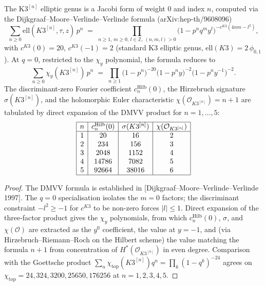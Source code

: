 \begin{proposition}
\label{prop:k3n-elliptic-genus-DMVV}
The K$3^{[n]}$ elliptic genus is a Jacobi form of weight $0$ and
index $n$, computed via the
Dijkgraaf--Moore--Verlinde--Verlinde formula
\textup{(}arXiv:hep-th/9608096\textup{)}
\[
 \sum_{n \geq 0} \mathrm{ell}(K3^{[n]}, \tau, z) \, p^n
 \;=\; \prod_{n \geq 1, \, m \geq 0, \, l \in \mathbb{Z},
 \, (n, m, l) > 0}
 \bigl(1 - p^n q^m y^l\bigr)^{-c^{K3}(4 n m - l^2)},
\]
with $c^{K3}(0) = 20$, $c^{K3}(-1) = 2$
\textup{(}standard K$3$ elliptic genus,
$\mathrm{ell}(K3) = 2 \, \phi_{0, 1}$\textup{).}
At $q = 0$, restricted to the $\chi_y$ polynomial, the formula reduces to
\[
 \sum_{n \geq 0} \chi_y(K3^{[n]}) \, p^n
 \;=\; \prod_{n \geq 1}
 \bigl(1 - p^n\bigr)^{-20}
 \bigl(1 - p^n y\bigr)^{-2}
 \bigl(1 - p^n y^{-1}\bigr)^{-2}.
\]
The discriminant-zero Fourier coefficient $c_n^{\mathrm{Hilb}}(0)$, the
Hirzebruch signature $\sigma(K3^{[n]})$, and the holomorphic Euler
characteristic \(\chi(\mathcal{O}_{K3^{[n]}})=n+1\) are tabulated by
direct expansion of the DMVV product for \(n=1,\ldots,5\):
\[
\begin{array}{|c|c|c|c|}
\hline
n & c_n^{\mathrm{Hilb}}(0) & \sigma(K3^{[n]}) & \chi(\mathcal{O}_{K3^{[n]}}) \\
\hline
1 & 20 & 16 & 2 \\
2 & 234 & 156 & 3 \\
3 & 2048 & 1152 & 4 \\
4 & 14786 & 7082 & 5 \\
5 & 92664 & 38016 & 6 \\
\hline
\end{array}
\]
\end{proposition}

\begin{proof}[Proof]
The DMVV formula is established in
\textup{[}Dijkgraaf--Moore--Verlinde--Verlinde 1997\textup{].} The
$q = 0$ specialisation isolates the $m = 0$ factors;
the discriminant constraint $-l^2 \geq -1$ for $c^{K3}$ to be
non-zero forces $|l| \leq 1$. Direct expansion of the three-factor
product gives the $\chi_y$ polynomials, from which $c_n^{\mathrm{Hilb}}(0)$,
$\sigma$, and $\chi(\mathcal{O})$ are extracted as the $y^0$ coefficient,
the value at $y = -1$, and \textup{(}via Hirzebruch--Riemann--Roch on
the Hilbert scheme\textup{)} the value matching the formula
$n + 1$ from concentration of $H^*(\mathcal{O}_{K3^{[n]}})$ in even
degree. Comparison with the Goettsche product
$\sum_n \chi_{\mathrm{top}}(K3^{[n]}) q^n = \prod_k (1 - q^k)^{-24}$
agrees on \(\chi_{\mathrm{top}}=24,324,3200,25650,176256\) at
\(n=1,2,3,4,5\).
\end{proof}

